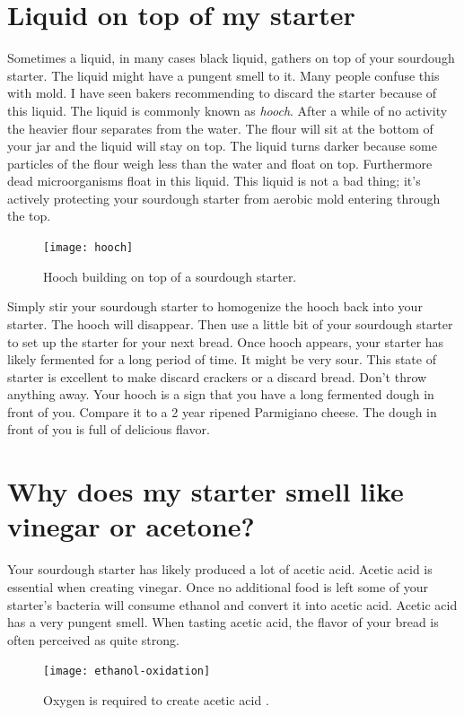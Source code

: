 \section{Liquid on top of my starter}

Sometimes a liquid, in many cases black liquid, gathers on top
of your sourdough starter. The liquid might have a pungent
smell to it. Many people confuse this with mold. I have seen
bakers recommending to discard the starter because of this liquid.
The liquid is commonly known as {\it hooch}. After a while
of no activity the heavier flour separates from the water. The flour
will sit at the bottom of your jar and the liquid will stay on top.
The liquid turns darker because some particles of the flour weigh
less than the water and float on top. Furthermore dead microorganisms
float in this liquid. This liquid is not a bad thing; it's actively
protecting your sourdough starter from aerobic mold entering through
the top.

\begin{figure}[!htb]
  \centering
  \texttt{[image: hooch]}
  \caption{Hooch building on top of a sourdough starter. \cite{liquid+on+starter}}
  \label{fig:hooch}
\end{figure}

Simply stir your sourdough starter to homogenize the hooch back
into your starter. The hooch will disappear. Then use a little bit of
your sourdough starter to set up the starter for your next bread.
Once hooch appears, your starter has likely fermented for a long
period of time. It might be very sour. This state of starter
is excellent to make discard crackers or a discard bread. Don't throw
anything away. Your hooch is a sign that you have a long fermented
dough in front of you. Compare it to a 2 year ripened Parmigiano cheese.
The dough in front of you is full of delicious flavor.

\section{Why does my starter smell like vinegar or acetone?}

Your sourdough starter has likely produced a lot of acetic acid.
Acetic acid is essential when creating vinegar. Once no additional
food is left some of your starter's bacteria will consume ethanol
and convert it into acetic acid. Acetic acid has a very pungent smell.
When tasting acetic acid, the flavor of your bread is often perceived
as quite strong.

\begin{figure}[!htb]
  \centering
  \texttt{[image: ethanol-oxidation]}
  \caption{Oxygen is required to create acetic acid \cite{acetic+acid+production}.}
  \label{fig:ethanol-oxidation}
\end{figure}

